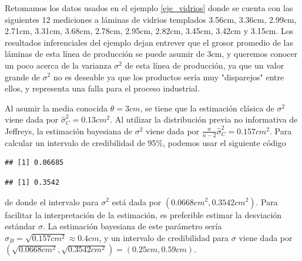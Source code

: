     \begin{Eje}
    Retomamos los datos usados en el ejemplo \ref{eje_vidrios} donde se cuenta con las siguientes 12 mediciones a l\'aminas de vidrios templados 3.56cm, 3.36cm, 2.99cm, 2.71cm, 3.31cm, 3.68cm, 2.78cm, 2.95cm, 2.82cm, 3.45cm, 3.42cm y 3.15cm. Los resultados inferenciales del ejemplo dejan entrever que el grosor promedio de las l\'aminas de esta l\'inea de producci\'on se puede asumir de 3cm, y queremos conocer un poco acerca de la varianza $\sigma^2$ de esta l\'inea de producci\'on, ya que un valor grande de $\sigma^2$ no es deseable ya que los productos ser\'ia muy "disparejos" entre ellos, y representa una falla para el proceso industrial. 
    
    Al asumir la media conocida $\theta=3cm$, se tiene que la estimaci\'on cl\'asica de $\sigma^2$ viene dada por $\hat{\sigma}^2_C=0.13cm^2$. Al utilizar la distribuci\'on previa no informativa de Jeffreys, la estimaci\'on bayesiana de $\sigma^2$ viene dada por $\frac{n}{n-2}\hat{\sigma}^2_C=0.157cm^2$. Para calcular un intervalo de credibilidad de 95\%, podemos usar el siguiente c\'odigo
\begin{knitrout}
\color{fgcolor}\begin{kframe}
\begin{alltt}
\hlstd{(}\hlstd{,} \hlstd{=}\hlopt{/}\hlstd{,} \hlstd{=}\hlopt{*}\hlopt{/}\hlstd{)}
\end{alltt}
\begin{verbatim}
## [1] 0.06685
\end{verbatim}
\begin{alltt}
\hlstd{(}\hlstd{,} \hlstd{=}\hlopt{/}\hlstd{,} \hlstd{=}\hlopt{*}\hlopt{/}\hlstd{)}
\end{alltt}
\begin{verbatim}
## [1] 0.3542
\end{verbatim}
\end{kframe}
\end{knitrout}
    
    de donde el intervalo para $\sigma^2$ est\'a dada por $(0.0668cm^2,0.3542cm^2)$. Para facilitar la interpretaci\'on de la estimaci\'on, es preferible estimar la desviaci\'on est\'andar $\sigma$. La estimaci\'on bayesiana de este par\'ametro ser\'ia $\hat{\sigma}_B=\sqrt{0.157cm^2}\approx 0.4cm$, y un intervalo de credibilidad para $\sigma$ viene dada por $(\sqrt{0.0668cm^2},\sqrt{0.3542cm^2})=(0.25cm,0.59cm)$.
    

\end{Eje}
